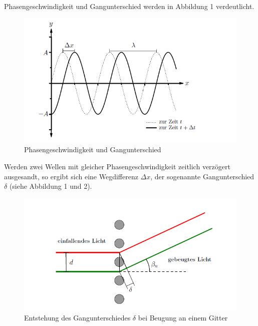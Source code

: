 \documentclass[12pt,a4paper,titlepage,headinclude,bibtotoc]{scrartcl}
\begin{document}
Phasengeschwindigkeit und Gangunterschied werden in Abbildung 1 verdeutlicht.

\begin{figure} [h]
\begin{center}
\includegraphics[scale=0.75]{Phasengeschwindigkeit2.png} \end{center}
\caption {Phasengeschwindigkeit und Gangunterschied }
\end{figure}

Werden zwei Wellen mit gleicher Phasengeschwindigkeit zeitlich verzögert ausgesandt, so ergibt sich eine Wegdifferenz $\Delta x$, der sogenannte Gangunterschied $\delta$  (siehe Abbildung 1 und 2). 

\begin{figure} [h!]
\begin{center}
\includegraphics[scale=0.65]{Gangunterschied.png} \end{center}
\caption {Entstehung des Gangunterschiedes $\delta$ bei Beugung an einem Gitter }
\end{figure}
\end{document}
